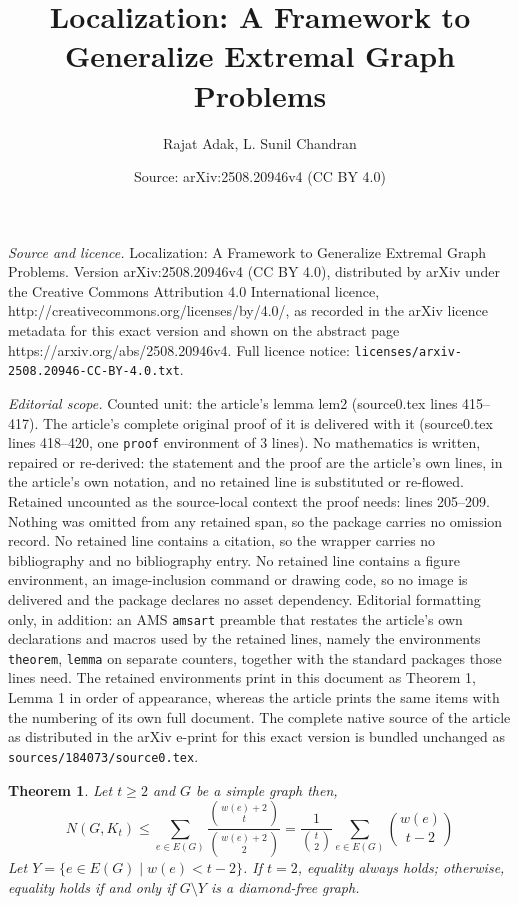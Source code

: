\documentclass[10pt,a4paper]{amsart}
\title{Localization: A Framework to Generalize Extremal Graph Problems}
\author{Rajat Adak, L. Sunil Chandran}
\date{Source: arXiv:2508.20946v4 (CC BY 4.0)}
\newtheorem{theorem}{Theorem}
\begin{document}
\maketitle

\noindent\emph{Source and licence.} Localization: A Framework to Generalize Extremal Graph Problems. Version arXiv:2508.20946v4 (CC BY 4.0), distributed by arXiv under the Creative Commons Attribution 4.0 International licence, http://creativecommons.org/licenses/by/4.0/, as recorded in the arXiv licence metadata for this exact version and shown on the abstract page https://arxiv.org/abs/2508.20946v4. Full licence notice: \texttt{licenses/arxiv-2508.20946-CC-BY-4.0.txt}.\par\smallskip

\noindent\textit{Editorial scope.} Counted unit: the article's lemma lem2 (source0.tex lines 415--417). The article's complete original proof of it is delivered with it (source0.tex lines 418--420, one \texttt{proof} environment of 3 lines). No mathematics is written, repaired or re-derived: the statement and the proof are the article's own lines, in the article's own notation, and no retained line is substituted or re-flowed.  Retained uncounted as the source-local context the proof needs: lines 205--209.  Nothing was omitted from any retained span, so the package carries no omission record.  No retained line contains a citation, so the wrapper carries no bibliography and no bibliography entry.  No retained line contains a figure environment, an image-inclusion command or drawing code, so no image is delivered and the package declares no asset dependency.  Editorial formatting only, in addition: an AMS \texttt{amsart} preamble that restates the article's own declarations and macros used by the retained lines, namely the environments \texttt{theorem}, \texttt{lemma} on separate counters, together with the standard packages those lines need.  The retained environments print in this document as Theorem 1, Lemma 1 in order of appearance, whereas the article prints the same items with the numbering of its own full document.  The complete native source of the article as distributed in the arXiv e-print for this exact version is bundled unchanged as \texttt{sources/184073/source0.tex}.
\begin{theorem}\label{thm1}
    Let $t\geq 2$ and $G$ be a simple graph then,
    \[N(G,K_t) \leq \sum_{e\in E(G)} \frac{{w(e) +2 \choose t}}{{w(e)+2 \choose 2}} = \frac{1}{{t\choose 2}}\sum_{e \in E(G)}{w(e)\choose t-2}\]
    Let $Y = \{e \in E(G)\mid w(e) < t-2\}$. If $t =2$, equality always holds; otherwise, equality holds if and only if $G\setminus Y$ is a diamond-free graph.
\end{theorem}
\end{document}
